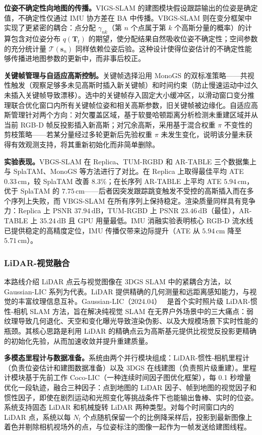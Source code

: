 \textbf{位姿不确定性向地图的传播。}VIGS-SLAM 的建图模块假设跟踪输出的位姿是确定值，不确定性仅通过 IMU 协方差在 BA 中传播。VBGS-SLAM 则在变分框架中实现了更紧密的耦合：点分配 $\gamma_{nk}$（第 $n$ 个点属于第 $k$ 个高斯分量的概率）的计算包含对位姿分布 $q(\mathbf{T}_t)$ 的期望，使分配结果自然吸收位姿不确定性；空间参数的充分统计量 $\mathcal{T}(\mathbf{s}_n)$ 同样依赖位姿后验。这种设计使得位姿估计的不确定性能够传播进地图参数的更新中，而非事后校正。

\textbf{关键帧管理与自适应高斯控制。}关键帧选择沿用 MonoGS 的双标准策略——共视性触发（观察足够多未见高斯时插入新关键帧）和时间约束（防止慢速运动中过久未插入关键帧导致漂移）。选中的关键帧存入固定大小缓冲区，以滑动窗口变分推理联合优化窗口内所有关键帧位姿和相关高斯参数，旧关键帧被边缘化。自适应高斯管理针对两个方向：对欠覆盖区域，基于软曼哈顿距离分析检测未重建区域并从当前 RGB-D 帧反投影插入新高斯；对冗余高斯，采用基于混合权重 $\pi$ 不变性的剪枝策略——若某分量经过多轮更新后先验权重 $\pi$ 未发生变化，说明该分量未获得有效观测支持，将其重新初始化而非简单删除。

\textbf{实验表现。}VBGS-SLAM 在 Replica、TUM-RGBD 和 AR-TABLE 三个数据集上与 SplaTAM、MonoGS 等方法进行了对比。在 Replica 上取得最佳平均 ATE $0.33\,\mathrm{cm}$，较 SplaTAM 改善 $8.3\%$；在长序列 AR-TABLE 上平均 ATE $5.94\,\mathrm{cm}$，优于 SplaTAM 的 $7.75\,\mathrm{cm}$——后者因突发跟踪跳变触发不受控的高斯插入而在多个序列上失败，而 VBGS-SLAM 在所有序列上保持稳定。渲染质量同样具有竞争力：Replica 上 PSNR $37.94\,\mathrm{dB}$，TUM-RGBD 上 PSNR $23.46\,\mathrm{dB}$（最佳），AR-TABLE 上 $35.24\,\mathrm{dB}$ 且 GPU 用量最低。IMU 消融实验表明核心 RGB-D 流水线已提供稳定的高精度定位，IMU 传播仅带来边际提升（ATE 从 $5.94\,\mathrm{cm}$ 降至 $5.71\,\mathrm{cm}$）。

\subsubsection{LiDAR-视觉融合}

本路线介绍 LiDAR 点云与视觉图像在 3DGS SLAM 中的紧耦合方法，以 Gaussian-LIC 系列为代表。LiDAR 提供精确的几何测量和远距离感知能力，与视觉的丰富纹理信息互补。Gaussian-LIC（2024.04）~\cite{2404_06926} 是首个实时照片级 LiDAR-惯性-相机 SLAM 方法，旨在解决纯视觉 SLAM 在无界户外场景中的三大痛点：弱纹理导致几何退化、天空和变化曝光导致渲染伪影、以及大规模场景下实时性能的瓶颈。其核心思路是利用 LiDAR 的精确点云为高斯基元提供比视觉反投影更精确的初始化先验，从而加速收敛并提升重建质量。

\textbf{多模态里程计与数据准备。}系统由两个并行模块组成：LiDAR-惯性-相机里程计（负责位姿估计和建图数据准备）以及 3DGS 在线建图（负责照片级重建）。里程计模块基于先前工作 Coco-LIC（一种连续时间因子图优化框架），每 0.1 秒增量优化一段轨迹，融合三种因子：点到地图的 LiDAR 因子、帧到地图的视觉因子和惯性因子，即使在剧烈运动和光照变化等挑战条件下也能输出鲁棒、实时的位姿。系统支持固态 LiDAR 和机械旋转 LiDAR 两种类型。对每个时间窗口内的 LiDAR 点，系统以每 $N_l$ 个点随机保留一个的比例降采样后，投影到最新图像上着色并剔除相机视场外的点，与位姿标注的图像一起作为一帧发送给建图线程。


